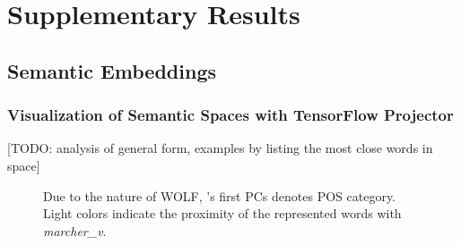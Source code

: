 \chapter{Supplementary Results} %
\label{app:suppresults}
\section{Semantic Embeddings}
\subsection{Visualization of Semantic Spaces with TensorFlow Projector}
[TODO: analysis of general form, examples by listing the most close words in space]

\begin{figure}
    \centering
    \begin{minipage}[t]{.5\textwidth}
        \centering
        \caption[French  Space Visualization]{Due to the nature of WOLF, 
        's first PCs denotes POS category. Light colors indicate the proximity of the represented words with \emph{marcher\_v}.}
        \label{fig:freSIMmarcher}
    \end{minipage}%
    \begin{minipage}[t]{.5\textwidth}

\end{minipage}
\end{figure}
